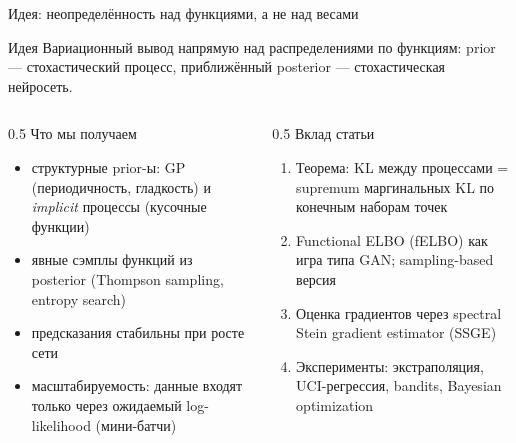 \documentclass[aspectratio=169,9pt]{beamer}
\begin{document}
\begin{frame}{Идея: неопределённость над функциями, а не над весами}
  \begin{alertblock}{Идея}
    Вариационный вывод напрямую над распределениями по функциям: prior --- стохастический процесс, приближённый posterior --- стохастическая нейросеть.
  \end{alertblock}
  \vspace{0.3em}
  \begin{columns}[T]
    \begin{column}{0.5\textwidth}
      \textcolor{structure}{Что мы получаем}
      \begin{itemize}
        \item структурные prior-ы: GP (периодичность, гладкость) и \emph{implicit} процессы (кусочные функции)
        \item явные сэмплы функций из posterior (Thompson sampling, entropy search)
        \item предсказания стабильны при росте сети
        \item масштабируемость: данные входят только через ожидаемый log-likelihood (мини-батчи)
      \end{itemize}
    \end{column}
    \begin{column}{0.5\textwidth}
      \textcolor{structure}{Вклад статьи}
      \begin{enumerate}
        \item Теорема: KL между процессами = supremum маргинальных KL по конечным наборам точек
        \item Functional ELBO (fELBO) как игра типа GAN; sampling-based версия
        \item Оценка градиентов через spectral Stein gradient estimator (SSGE)
        \item Эксперименты: экстраполяция, UCI-регрессия, bandits, Bayesian optimization
      \end{enumerate}
    \end{column}
  \end{columns}
\end{frame}
\end{document}
